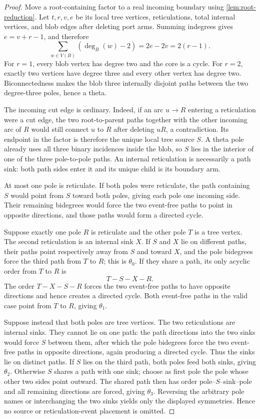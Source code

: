 \documentclass[11pt]{article}
\theoremstyle{remark}
\newcommand{\1}{\mathbf 1}
\begin{document}
\begin{proof}
Move a root-containing factor to a real incoming boundary using
\cref{lem:root-reduction}.  Let \(t,r,v,e\) be its local tree vertices,
reticulations, total internal vertices, and blob edges after deleting port
arms.  Summing indegrees gives \(e=v+r-1\), and therefore
\[
 \sum_{w\in V(B)}(\deg_B(w)-2)=2e-2v=2(r-1).
\]
For \(r=1\), every blob vertex has degree two and the core is a cycle.  For
\(r=2\), exactly two vertices have degree three and every other vertex has
degree two.  Biconnectedness makes the blob three internally disjoint paths
between the two degree-three poles, hence a theta.

The incoming cut edge is ordinary.  Indeed, if an arc \(u\to R\) entering a
reticulation were a cut edge, the two root-to-parent paths together with the
other incoming arc of \(R\) would still connect \(u\) to \(R\) after deleting
\(uR\), a contradiction.  Its endpoint in the factor is therefore the unique
local tree source \(S\).  A theta pole already uses all three binary
incidences inside the blob, so \(S\) lies in the interior of one of the three
pole-to-pole paths.  An internal reticulation is necessarily a path sink:
both path sides enter it and its unique child is its boundary arm.

At most one pole is reticulate.  If both poles were reticulate, the path
containing \(S\) would point from \(S\) toward both poles, giving each pole
one incoming side.  Their remaining bidegrees would force the two event-free
paths to point in opposite directions, and those paths would form a directed
cycle.

Suppose exactly one pole \(R\) is reticulate and the other pole \(T\) is a
tree vertex.  The second reticulation is an internal sink \(X\).  If \(S\)
and \(X\) lie on different paths, their paths point respectively away from
\(S\) and toward \(X\), and the pole bidegrees force the third path from
\(T\) to \(R\); this is \(\theta_0\).  If they share a path, its only acyclic
order from \(T\) to \(R\) is
\[
 T-S-X-R.
\]
The order \(T-X-S-R\) forces the two event-free paths to have opposite
directions and hence creates a directed cycle.  Both event-free paths in the
valid case point from \(T\) to \(R\), giving \(\theta_1\).

Suppose instead that both poles are tree vertices.  The two reticulations are
internal sinks.  They cannot lie on one path: the path directions into the
two sinks would force \(S\) between them, after which the pole bidegrees force
the two event-free paths in opposite directions, again producing a directed
cycle.  Thus the sinks lie on distinct paths.  If \(S\) lies on the third
path, both poles feed both sinks, giving \(\theta_2\).  Otherwise \(S\)
shares a path with one sink; choose as first pole the pole whose other two
sides point outward.  The shared path then has order
pole--\(S\)--sink--pole and all remaining directions are forced, giving
\(\theta_3\).  Reversing the arbitrary pole names or interchanging the two
sinks yields only the displayed symmetries.  Hence no source or
reticulation-event placement is omitted.


\end{proof}
\end{document}
